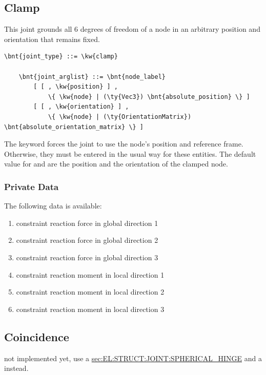 \subsection{Clamp}
This joint grounds all 6 degrees of freedom of a node
in an arbitrary position and orientation that remains fixed.
\begin{Verbatim}[commandchars=\\\{\}]
    \bnt{joint_type} ::= \kw{clamp}

    \bnt{joint_arglist} ::= \bnt{node_label}
        [ [ , \kw{position} ] ,
            \{ \kw{node} | (\ty{Vec3}) \bnt{absolute_position} \} ]
        [ [ , \kw{orientation} ] ,
            \{ \kw{node} | (\ty{OrientationMatrix}) \bnt{absolute_orientation_matrix} \} ]
\end{Verbatim}
The keyword  forces the joint to use
the node's position and reference frame. Otherwise, they must be entered
in the usual way for these entities.
The default value for  and 
are the position and the orientation of the clamped node.

\subsubsection{Private Data}
The following data is available:
\begin{enumerate}
\item {} constraint reaction force in global direction 1
\item {} constraint reaction force in global direction 2
\item {} constraint reaction force in global direction 3
\item {} constraint reaction moment in local direction 1
\item {} constraint reaction moment in local direction 2
\item {} constraint reaction moment in local direction 3
\end{enumerate}




\subsection{Coincidence}
not implemented yet, use a
\hyperref{\kw{spherical hinge}}{\kw{spherical hinge} (see Section~}{)}{sec:EL:STRUCT:JOINT:SPHERICAL_HINGE}
and a  
instead.

